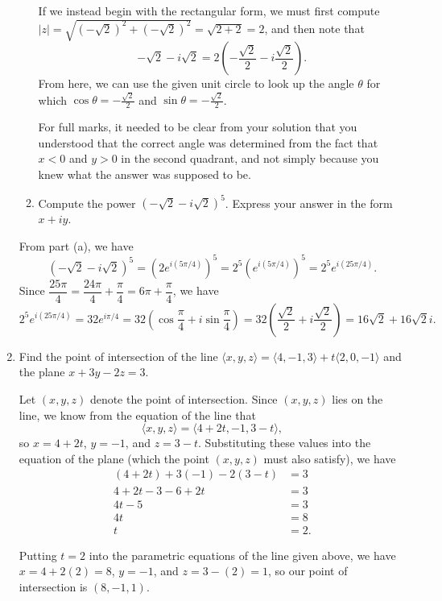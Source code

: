 \documentclass[12pt]{article}
\newcommand{\points}[1]{\marginpar{\hspace{24pt}[#1]}}
\newcommand{\abs}[1]{\lvert #1\rvert}
\begin{document}
\begin{enumerate}
\begin{enumerate}
If we instead begin with the rectangular form, we must first compute \\$\abs{z} = \sqrt{(-\sqrt{2})^2+(-\sqrt{2})^2} = \sqrt{2+2}=2$, and then note that
\[
 -\sqrt{2}-i\sqrt{2} = 2\left(-\frac{\sqrt{2}}{2}-i\frac{\sqrt{2}}{2}\right).
\]
From here, we can use the given unit circle to look up the angle $\theta$ for which $\cos\theta = -\frac{\sqrt{2}}{2}$ and $\sin\theta = -\frac{\sqrt{2}}{2}$.

For full marks, it needed to be clear from your solution that you understood that the correct angle was determined from the fact that $x<0$ and $y>0$ in the second quadrant, and not simply because you knew what the answer was supposed to be.
\medskip

 \item Compute the power $(-\sqrt{2}-i\sqrt{2})^5$. Express your answer in the form $x+iy$. \points{5}
\end{enumerate}

\bigskip

From part (a), we have
\[
 (-\sqrt{2}-i\sqrt{2})^5 = \left(2e^{i(5\pi/4)}\right)^5 = 2^5\left(e^{i(5\pi/4)}\right)^5 = 2^5e^{i(25\pi/4)}.
\]
Since $\dfrac{25\pi}{4} = \dfrac{24\pi}{4}+\dfrac{\pi}{4} = 6\pi+\dfrac{\pi}{4}$, we have
\[
 2^5e^{i(25\pi/4)} = 32e^{i\pi/4} = 32\left(\cos \frac{\pi}{4}+i\sin\frac{\pi}{4}\right) = 32\left(\frac{\sqrt{2}}{2}+i\frac{\sqrt{2}}{2}\right) = 16\sqrt{2}+16\sqrt{2}i.
\]



\item Find the point of intersection of the line $\langle x,y,z\rangle = \langle 4, -1, 3\rangle+t\langle 2, 0, -1\rangle$ and the plane $x+3y-2z=3$. \points{4}

\bigskip

Let $(x,y,z)$ denote the point of intersection. Since $(x,y,z)$ lies on the line, we know from the equation of the line that
\[
 \langle x,y,z\rangle = \langle 4+2t,-1,3-t\rangle,
\]
so $x=4+2t$, $y=-1$, and $z=3-t$. Substituting these values into the equation of the plane (which the point $(x,y,z)$ must also satisfy), we have
\begin{align*}
 (4+2t)+3(-1)-2(3-t) & = 3\\
 4+2t-3-6+2t&=3\\
 4t-5&=3\\
 4t & = 8\\
 t&=2.
\end{align*}

Putting $t=2$ into the parametric equations of the line given above, we have $x=4+2(2)=8$, $y=-1$, and $z=3-(2) = 1$, so our point of intersection is $(8,-1,1)$.
\newpage


\end{enumerate}
\end{document}
